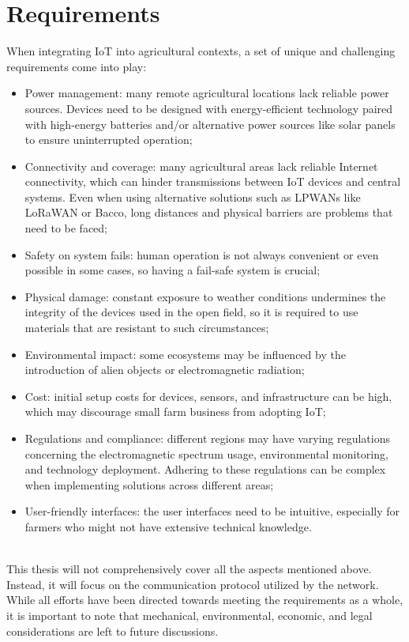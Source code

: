 \section{Requirements}
When integrating \gls{IoT} into agricultural contexts, a set of unique and challenging requirements come into play:
\begin{itemize}
    \item Power management: many remote agricultural locations lack reliable power sources. Devices need to be
        designed with energy-efficient technology paired with high-energy batteries and/or alternative power sources
        like solar panels to ensure uninterrupted operation;
    \item Connectivity and coverage: many agricultural areas lack reliable Internet connectivity, which can hinder
        transmissions between IoT devices and central systems. Even when using alternative solutions such as
        \glspl{LPWAN} like LoRaWAN or Bacco, long distances and physical barriers are problems that need to be faced;
    \item Safety on system fails: human operation is not always convenient or even possible in
        some cases, so having a fail-safe system is crucial;
    \item Physical damage: constant exposure to weather conditions undermines the integrity of the devices used in the
        open field, so it is required to use materials that are resistant to such circumstances;
    \item Environmental impact: some ecosystems may be influenced by the introduction of alien objects or
        electromagnetic radiation;
    \item Cost: initial setup costs for devices, sensors, and infrastructure can be high, which may discourage small
        farm business from adopting \gls{IoT};
    \item Regulations and compliance: different regions may have varying regulations concerning the electromagnetic
        spectrum usage, environmental monitoring, and technology deployment. Adhering to these regulations can be
        complex when implementing solutions across different areas;
    \item User-friendly interfaces: the user interfaces need to be intuitive, especially for farmers who might not
        have extensive technical knowledge.
\end{itemize}
\\
This thesis will not comprehensively cover all the aspects mentioned above. Instead, it will focus on the
communication protocol utilized by the network. While all efforts have been directed towards meeting the
requirements as a whole, it is important to note that mechanical, environmental, economic, and legal considerations are
left to future discussions.

